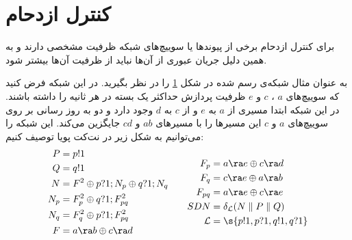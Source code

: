 \section{کنترل ازدحام}
برای کنترل ازدحام
برخی از پیوند‌ها یا سوییچ‌های شبکه ظرفیت مشخصی دارند و به همین دلیل جریان
عبوری از آن‌ها نباید از ظرفیت آن‌ها بیشتر شود.

\begin{figure}
    \centering
    \caption{ }
    \label{fig:congestion}
\end{figure}
به عنوان مثال شبکه‌ی رسم شده در شکل
\ref{fig:congestion}
را در نظر بگیرید.
در این شبکه فرض کنید که سوییچ‌های
$a$
،
$c$
و
$e$
ظرفیت پردازش حداکثر یک بسته در هر ثانیه را داشته باشند.
در این شبکه ابتدا مسیری از
$a$
به
$e$
و از
$c$
به
$d$
وجود دارد و دو به روز رسانی بر روی سوییچ‌های
$a$
و
$c$
این مسیر‌ها را با مسیر‌های
$ab$
و
$cd$
جایگزین می‌کند.
این شبکه را می‌توانیم به شکل زیر در نت‌کت پویا توصیف کنیم:
\begin{equation*}
    \begin{aligned}[c]
        P   & = p!1                               \\
        Q   & = q!1                               \\
        N   & = F^2 \oplus p?1;N_p \oplus q?1;N_q \\
        N_p & = F_p^2 \oplus q?1;F_{pq}^2         \\
        N_q & = F_q^2 \oplus p?1;F_{pq}^2         \\
        F   & = a\ra b \oplus c\ra d                      \\
    \end{aligned}
    \qquad
    \begin{aligned}[c]
        F_p         & = a\ra e \oplus c\ra d         \\
        F_q         & = c\ra e \oplus a\ra b         \\
        F_{pq}      & = a\ra e \oplus c\ra e         \\
        SDN         & = \delta_{\mathcal{L}}
        (N \parallel P \parallel Q)          \\
        \mathcal{L} & = \s{p!1,p?1,q!1,q?1}
    \end{aligned}
\end{equation*}
